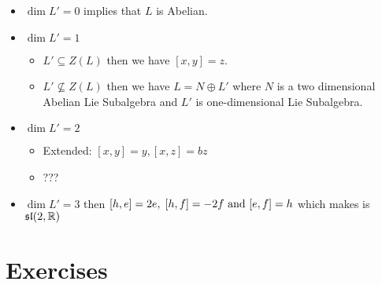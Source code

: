 \documentclass[12pt,a4paper]{report}
\begin{document}
\begin{itemize}
	\item $\dim L' = 0$ implies that $L$ is Abelian.
	\item $\dim L' = 1$
	\begin{itemize}
		\item $L' \subseteq Z(L)$ then we have $[x,y]=z$.
		\item $L' \not \subseteq Z(L)$ then we have $L = N\oplus L'$ where $N$ is a two dimensional Abelian Lie Subalgebra and $L'$ is one-dimensional Lie Subalgebra.
	\end{itemize}
	
	\item $\dim L' = 2$
	\begin{itemize}
		\item Extended: $[x,y]=y, [x,z]=bz$
		\item ???
	\end{itemize}
	
	\item $\dim L'=3$ then $[h,e] = 2e,\;[h,f]=-2f \text{ and } [e,f]=h$ which makes is $\mathfrak{sl}(2,\mathbb{R})$
\end{itemize}

\section{Exercises}
\end{document}
